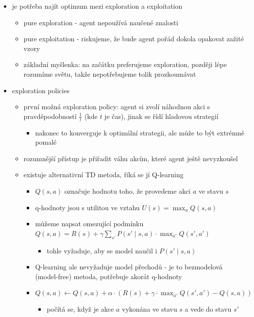 \begin{itemize}
\begin{itemize}
\begin{itemize}
\item zlepšováním modelu se postupně zvětšují odměny, které agent získává
\end{itemize}
\item je potřeba najít optimum mezi exploration a exploitation
\begin{itemize}
\item pure exploration - agent nepoužívá naučené znalosti
\item pure exploitation - riskujeme, že bude agent pořád dokola opakovat zažité vzory
\item základní myšlenka: na začátku preferujeme exploration, později lépe rozumíme světu, takže nepotřebujeme tolik prozkoumávat
\end{itemize}
\item exploration policies
\begin{itemize}
\item první možná exploration policy: agent si zvolí náhodnou akci s pravděpodobností $\frac1t$ (kde $t$ je čas), jinak se řídí hladovou strategií
\begin{itemize}
\item nakonec to konverguje k optimální strategii, ale může to být extrémně pomalé
\end{itemize}
\item rozumnější přístup je přiřadit váhu akcím, které agent ještě nevyzkoušel
\item existuje alternativní TD metoda, říká se jí Q-learning
\begin{itemize}
\item $Q(s,a)$ označuje hodnotu toho, že provedeme akci $a$ ve stavu $s$
\item q-hodnoty jsou s utilitou ve vztahu $U(s)=\max_a Q(s,a)$
\item můžeme napsat omezující podmínku $Q(s,a)=R(s)+\gamma\sum_{s'} P(s'\mid s,a)\cdot \max_{a'}Q(s',a')$
\begin{itemize}
\item tohle vyžaduje, aby se model naučil i $P(s'\mid s,a)$
\end{itemize}
\item Q-learning ale nevyžaduje model přechodů - je to bezmodelová (model-free) metoda, potřebuje akorát q-hodnoty
\item $Q(s,a)\leftarrow Q(s,a)+\alpha\cdot (R(s)+\gamma\cdot\max_{a'}Q(s',a')-Q(s,a))$
\begin{itemize}
\item počítá se, když je akce $a$ vykonána ve stavu $s$ a vede do stavu $s'$

\end{itemize}
\end{itemize}
\end{itemize}
\end{itemize}
\end{itemize}
